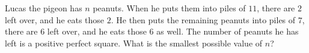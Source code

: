 Lucas the pigeon has $n$ peanuts. When he puts them into piles of $11$, there are $2$ left over, and he eats those $2$. He then puts the remaining peanuts into piles of $7$, there are $6$ left over, and he eats those $6$ as well. The number of peanuts he has left is a positive perfect square. What is the smallest possible value of $n$?
